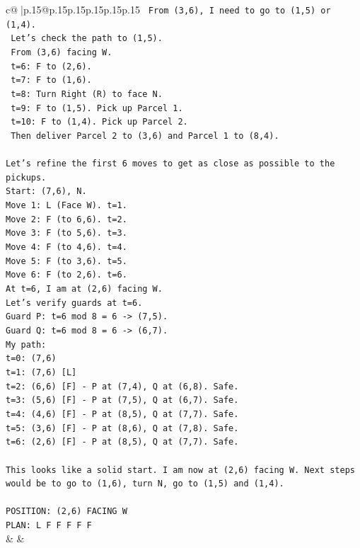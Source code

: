 \documentclass{article}
\begin{document}
{\begin{supertabular}{c@{$\;$}|p{.15\linewidth}@{}p{.15\linewidth}p{.15\linewidth}p{.15\linewidth}p{.15\linewidth}p{.15\linewidth}}
{{{\texttt{   From (3,6), I need to go to (1,5) or (1,4).} \\
\texttt{   Let's check the path to (1,5).} \\
\texttt{   From (3,6) facing W.} \\
\texttt{   t=6: F to (2,6).} \\
\texttt{   t=7: F to (1,6).} \\
\texttt{   t=8: Turn Right (R) to face N.} \\
\texttt{   t=9: F to (1,5). Pick up Parcel 1.} \\
\texttt{   t=10: F to (1,4). Pick up Parcel 2.} \\
\texttt{   Then deliver Parcel 2 to (3,6) and Parcel 1 to (8,4).} \\
\\ 
\texttt{Let's refine the first 6 moves to get as close as possible to the pickups.} \\
\texttt{Start: (7,6), N.} \\
\texttt{Move 1: L (Face W). t=1.} \\
\texttt{Move 2: F (to 6,6). t=2.} \\
\texttt{Move 3: F (to 5,6). t=3.} \\
\texttt{Move 4: F (to 4,6). t=4.} \\
\texttt{Move 5: F (to 3,6). t=5.} \\
\texttt{Move 6: F (to 2,6). t=6.} \\
\texttt{At t=6, I am at (2,6) facing W.} \\
\texttt{Let's verify guards at t=6.} \\
\texttt{Guard P: t=6 mod 8 = 6 {-}> (7,5).} \\
\texttt{Guard Q: t=6 mod 8 = 6 {-}> (6,7).} \\
\texttt{My path:} \\
\texttt{t=0: (7,6)} \\
\texttt{t=1: (7,6) {[}L{]}} \\
\texttt{t=2: (6,6) {[}F{]} {-} P at (7,4), Q at (6,8). Safe.} \\
\texttt{t=3: (5,6) {[}F{]} {-} P at (7,5), Q at (6,7). Safe.} \\
\texttt{t=4: (4,6) {[}F{]} {-} P at (8,5), Q at (7,7). Safe.} \\
\texttt{t=5: (3,6) {[}F{]} {-} P at (8,6), Q at (7,8). Safe.} \\
\texttt{t=6: (2,6) {[}F{]} {-} P at (8,5), Q at (7,7). Safe.} \\
\\ 
\texttt{This looks like a solid start. I am now at (2,6) facing W. Next steps would be to go to (1,6), turn N, go to (1,5) and (1,4).} \\
\\ 
\texttt{POSITION: (2,6) FACING W} \\
\texttt{PLAN: L F F F F F} \\
            }
        }
    }
    & & \\ \\


\end{supertabular}}
\end{document}
